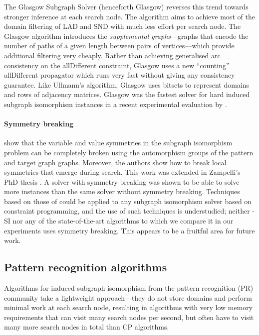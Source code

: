 The Glasgow Subgraph Solver
\citep{DBLP:conf/cp/McCreeshP15,DBLP:conf/gg/McCreeshP020} (henceforth Glasgow)
reverses this trend towards stronger inference at each search node.  The
algorithm aims to achieve most of the domain filtering of LAD and SND with much
less effort per search node.
The Glasgow algorithm introduces the
\emph{supplemental graphs}---graphs that encode the number of paths
of a given length between pairs of vertices---which provide additional filtering
very cheaply.
Rather than achieving generalised arc consistency on the allDifferent
constraint, Glasgow uses a new ``counting'' allDifferent propagator which runs
very fast without giving any consistency guarantee.
Like Ullmann's algorithm, Glasgow uses bitsets to represent domains and rows
of adjacency matrices.
Glasgow was the fastest solver for hard induced
subgraph isomorphism instances in a recent experimental evaluation by
\citet{DBLP:conf/gbrpr/Solnon19}.

\paragraph*{Symmetry breaking}
\citet{zampelli2007symmetry} show that the variable and value symmetries
in the subgraph isomorphism problem can be completely broken using
the automorphism groups of the pattern and target graph graphs.
Moreover, the authors show how to break local symmetries that emerge
during search.
This work was extended in Zampelli's PhD thesis \citep{DBLP:phd/basesearch/Zampelli08}.
A solver with symmetry breaking was shown to be able to solve more instances
than the same solver without symmetry breaking. 
Techniques based on those of \citeauthor{zampelli2007symmetry} 
could be applied to any subgraph isomorphism solver based on constraint programming,
and the use of such techniques is understudied; neither \McSplit-SI nor any of
the state-of-the-art algorithms to which we compare it in our experiments
uses symmetry breaking.  This appears to be a fruitful area for future
work.

\subsection{Pattern recognition algorithms}\label{subsec:pr-sip}

Algorithms for induced subgraph isomorphism from the pattern recognition (PR) community
take a lightweight approach---they do not store domains and perform
minimal work at each search node, resulting in algorithms with very low memory
requirements that can visit many search nodes per second, but often have to
visit many more search nodes in total than CP algorithms.

